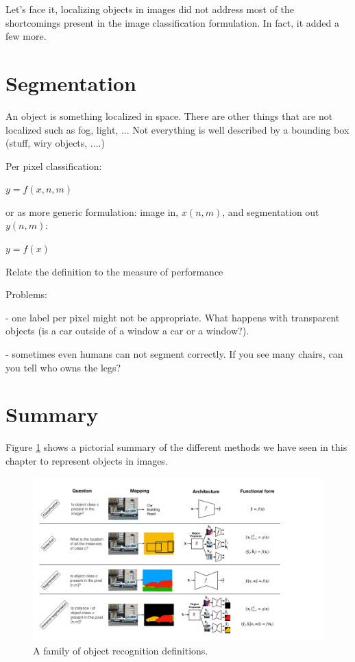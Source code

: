 Let's face it, localizing objects in images did not address most of the shortcomings present in the image classification formulation. In fact, it added a few more.
		
\section{Segmentation}

An object is something localized in space. There are other things that are not localized such as fog, light, ... Not everything is well described by a bounding box (stuff, wiry objects, ....)

Per pixel classification:

$y = f(x, n, m)$

or as more generic formulation: image in, $x(n,m)$, and segmentation out $y(n,m)$:

$y = f(x)$

Relate the definition to the measure of performance

Problems: 

- one label per pixel might not be appropriate. What happens with transparent objects (is a car outside of a window a car or a window?). 

- sometimes even humans can not segment correctly. If you see many chairs, can you tell who owns the legs?


\section{Summary}

Figure \ref{fig:pictorialsummary} shows a pictorial summary of the different methods we have seen in this chapter to represent objects in images. 

\begin{figure}
\includegraphics[width=1\linewidth]{figures/object_recognition/model_cards.pdf}
\caption{A family of object recognition definitions.}
\label{fig:pictorialsummary}
\end{figure}



